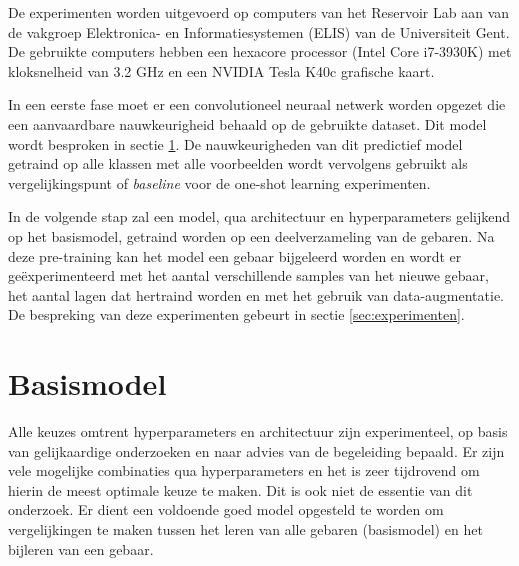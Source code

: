 De experimenten worden uitgevoerd op computers van het Reservoir Lab aan van de vakgroep Elektronica- en Informatiesystemen (ELIS) van de Universiteit Gent. De gebruikte computers hebben een hexacore processor (Intel Core i7-3930K) met kloksnelheid van 3.2 GHz en een NVIDIA Tesla K40c grafische kaart.

\npar In een eerste fase moet er een convolutioneel neuraal netwerk worden opgezet die een aanvaardbare nauwkeurigheid behaald op de gebruikte dataset. Dit model wordt besproken in sectie \ref{sec:basismodel}. De nauwkeurigheden van dit predictief model getraind op alle klassen met alle voorbeelden wordt vervolgens gebruikt als vergelijkingspunt of \textit{baseline} voor de one-shot learning experimenten.

\npar In de volgende stap zal een model, qua architectuur en hyperparameters gelijkend op het basismodel, getraind worden op een deelverzameling van de gebaren. Na deze pre-training kan het model een gebaar bijgeleerd worden en wordt er ge\"experimenteerd met het aantal verschillende samples van het nieuwe gebaar, het aantal lagen dat hertraind worden en met het gebruik van data-augmentatie. De bespreking van deze experimenten gebeurt in sectie \ref{sec:experimenten}.

\section{Basismodel}\label{sec:basismodel}
Alle keuzes omtrent hyperparameters en architectuur zijn experimenteel, op basis van gelijkaardige onderzoeken en naar advies van de begeleiding bepaald. Er zijn vele mogelijke combinaties qua hyperparameters en het is zeer tijdrovend om hierin de meest optimale keuze te maken. Dit is ook niet de essentie van dit onderzoek. Er dient een voldoende goed model opgesteld te worden om vergelijkingen te maken tussen het leren van alle gebaren (basismodel) en het bijleren van een gebaar. 
